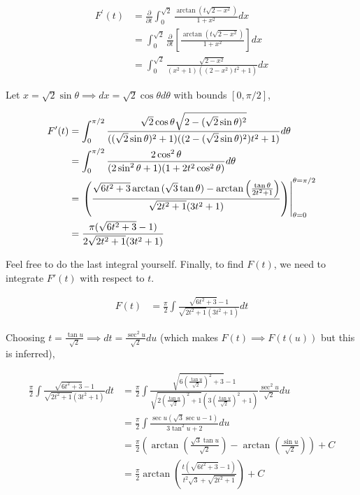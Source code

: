 \documentclass{article}
\begin{document}
\begin{align*}
    F^\prime(t) &= \frac{\partial}{\partial t}\int_{0}^{\sqrt{2}}{\frac{\arctan{(t\sqrt{2 - x^2})}}{1 + x^2}dx} \\ 
    &= \int_{0}^{\sqrt{2}}{\frac{\partial}{\partial t} \left[\frac{\arctan{(t\sqrt{2 - x^2})}}{1 + x^2}\right]dx} \\
    &= \int_{0}^{\sqrt{2}}{\frac{\sqrt{2-x^2}}{(x^2 + 1)((2-x^2)t^2 + 1)}dx}
\end{align*}

Let $x = \sqrt{2}\sin{\theta} \implies dx = \sqrt{2}\cos{\theta}d\theta$ with bounds $[0, \pi/2]$,

\begin{align*}
    F^\prime(t) &= \int_{0}^{\pi/2}{\frac{\sqrt{2}\cos{\theta}\sqrt{2 - (\sqrt{2}\sin{\theta})^2}}{((\sqrt{2}\sin{\theta})^2 + 1)((2 - (\sqrt{2}\sin{\theta})^2)t^2 + 1)}d\theta} \\
    &= \int_{0}^{\pi/2}{\frac{2\cos^2{\theta}}{(2\sin^2{\theta} + 1)(1 + 2t^2 \cos^2{\theta})}d\theta} \\ 
    &= \evalat*{\left(\frac{\sqrt{6t^2 + 3}\arctan{(\sqrt{3}\tan{\theta})} - \arctan{\left( \frac{\tan{\theta}}{2t^2 + 1} \right)}}{\sqrt{2t^2 + 1}(3t^2 + 1)}\right)}{\theta = \pi/2}_{\theta = 0} \\
    &= \frac{\pi(\sqrt{6t^2 +3} - 1)}{2\sqrt{2t^2 + 1}(3t^2 + 1)}
\end{align*}

Feel free to do the last integral yourself. Finally, to find $F(t)$, we need to integrate $F'(t)$ with respect to $t$.

\begin{align*}
    F(t) &= \frac{\pi}{2}\int{\frac{\sqrt{6t^2 +3} - 1}{\sqrt{2t^2 + 1}(3t^2 + 1)}dt}
\end{align*}

Choosing $t = \frac{\tan u}{\sqrt{2}} \implies dt = \frac{\sec^2{u}}{\sqrt{2}}du$ (which makes $F(t) \implies F(t(u))$ but this is inferred),

\begin{align*}
    \frac{\pi}{2}\int{\frac{\sqrt{6t^2 +3} - 1}{\sqrt{2t^2 + 1}(3t^2 + 1)}dt} &= \frac{\pi}{2}\int{\frac{\sqrt{6\left(\frac{\tan u}{\sqrt{2}}\right)^2 +3} - 1}{\sqrt{2\left(\frac{\tan u}{\sqrt{2}}\right)^2 + 1}\left(3\left(\frac{\tan u}{\sqrt{2}}\right)^2 + 1\right)}\frac{\sec^2{u}}{\sqrt{2}}du} \\ 
    &= \frac{\pi}{2} \int{\frac{\sec{u} (\sqrt{3}\sec{u} - 1)}{3\tan^2{u} + 2}du} \\
    &= \frac{\pi}{2}\left( \arctan{\left(\frac{\sqrt{3}\tan{u}}{\sqrt{2}}\right) - \arctan{\left( \frac{\sin{u}}{\sqrt{2}} \right)}} \right) + C \\ 
    &= \frac{\pi}{2}\arctan{\left( \frac{t(\sqrt{6t^2 + 3} - 1)}{t^2\sqrt{3} + \sqrt{2t^2 + 1}} \right)} + C
\end{align*}
\end{document}
